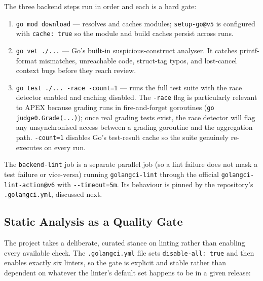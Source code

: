 The three backend steps run in order and each is a hard gate:

\begin{enumerate}
  \item \texttt{go mod download} --- resolves and caches modules;
  \texttt{setup-go@v5} is configured with \texttt{cache: true} so the
  module and build caches persist across runs.
  \item \texttt{go vet ./...} --- Go's built-in suspicious-construct
  analyser. It catches printf-format mismatches, unreachable code,
  struct-tag typos, and lost-cancel context bugs before they reach
  review.
  \item \texttt{go test ./... -race -count=1} --- runs the full test
  suite with the race detector enabled and caching disabled. The
  \texttt{-race} flag is particularly relevant to APEX because grading
  runs in fire-and-forget goroutines (\texttt{go judge0.Grade(...)});
  once real grading tests exist, the race detector will flag any
  unsynchronised access between a grading goroutine and the
  aggregation path. \texttt{-count=1} disables Go's test-result cache so
  the suite genuinely re-executes on every run.
\end{enumerate}

The \texttt{backend-lint} job is a separate parallel job (so a lint
failure does not mask a test failure or vice-versa) running
\texttt{golangci-lint} through the official
\texttt{golangci-lint-action@v6} with \texttt{-{}-timeout=5m}. Its
behaviour is pinned by the repository's \texttt{.golangci.yml}, discussed
next.

\subsection{Static Analysis as a Quality Gate}\label{sec:staticanalysis}

The project takes a deliberate, curated stance on linting rather than
enabling every available check. The \texttt{.golangci.yml} file sets
\texttt{disable-all: true} and then enables exactly six linters, so the
gate is explicit and stable rather than dependent on whatever the
linter's default set happens to be in a given release:

